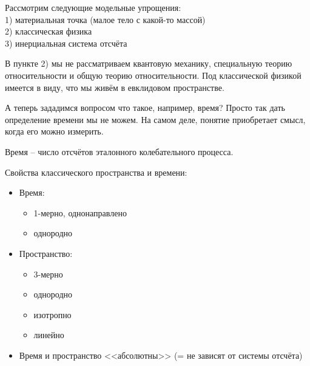 \documentclass[11pt]{article}
\begin{document}
\begin{definition}
    Рассмотрим следующие модельные упрощения: \\
    1) материальная точка (малое тело с какой-то массой)\\
    2) классическая физика \\
    3) инерциальная система отсчёта
    \begin{remark}
        В пункте 2) мы не рассматриваем квантовую механику, специальную теорию относительности и общую теорию относительности. Под классической физикой имеется в виду, что мы живём в евклидовом пространстве. 
    \end{remark}

\end{definition}

А теперь зададимся вопросом что такое, например, время? Просто так дать определение времени мы не можем. На самом деле, понятие приобретает смысл, когда его можно измерить. 
\begin{definition}
    Время -- число отсчётов эталонного колебательного процесса. 
\end{definition}

\begin{definition}
Свойства классического пространства и времени:
\begin{itemize}
    
    \item Время:
    \begin{itemize}
        \item 1-мерно, однонаправлено
        \item однородно
    \end{itemize} 
    \item Пространство:
    \begin{itemize}
        \item 3-мерно
        \item однородно
        \item изотропно
        \item линейно
    \end{itemize}
    \item Время и пространство <<абсолютны>> (= не зависят от системы отсчёта)
\end{itemize}
\end{definition}
\end{document}
